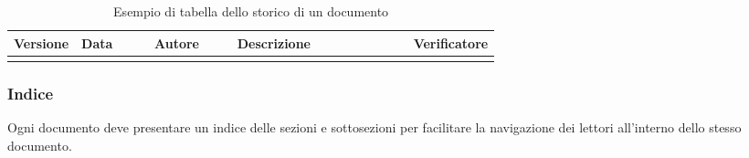 \documentclass[a4paper,12pt]{article}
\begin{document}
\begin{table}[h]
    \centering
    \small
    \renewcommand{\arraystretch}{1.2}
    \begin{tabularx}{\linewidth}{|>{\raggedright\arraybackslash}p{0.13\linewidth}|>{\raggedright\arraybackslash}p{0.15\linewidth}|>{\raggedright\arraybackslash}p{0.17\linewidth}|>{\raggedright\arraybackslash}X|>{\raggedright\arraybackslash}p{0.17\linewidth}|}
    \hline
    \rowcolor{gray!60}
    \textbf{Versione} & \textbf{Data} & \textbf{Autore} & \textbf{Descrizione} & \textbf{Verificatore} \\
    \hline
    \rowcolor{white}
    & & & & \\
    \hline
    \end{tabularx}
    \caption{Esempio di tabella dello storico di un documento}
\end{table}

\subsubsection*{Indice}
Ogni documento deve presentare un indice delle sezioni e sottosezioni per facilitare la navigazione dei lettori all'interno dello stesso documento.
\end{document}
